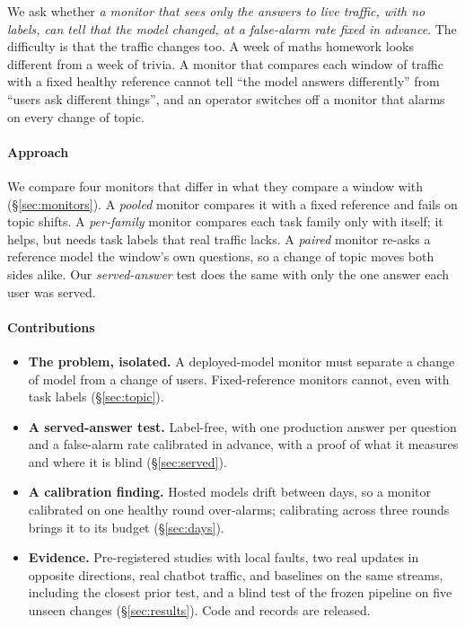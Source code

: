 \documentclass[11pt]{article}
\begin{document}
We ask whether \emph{a monitor that sees only the answers to live traffic, with no
labels, can tell that the model changed, at a false-alarm rate fixed in advance}.
The difficulty is that the traffic changes too. A week of maths homework looks
different from a week of trivia. A monitor that compares each window of traffic
with a fixed healthy reference cannot tell ``the model answers differently'' from
``users ask different things'', and an operator switches off a monitor that alarms
on every change of topic.

\paragraph{Approach} We compare four monitors that differ in what they compare a
window with (\S\ref{sec:monitors}). A \emph{pooled} monitor compares it with a
fixed reference and fails on topic shifts. A \emph{per-family} monitor compares
each task family only with itself; it helps, but needs task labels that real
traffic lacks. A \emph{paired} monitor re-asks a reference model the window's own
questions, so a change of topic moves both sides alike. Our \emph{served-answer}
test does the same with only the one answer each user was served.

\paragraph{Contributions}
\begin{itemize}[leftmargin=*,itemsep=1pt]
  \item \textbf{The problem, isolated.} A deployed-model monitor must separate a
  change of model from a change of users. Fixed-reference monitors cannot, even
  with task labels (\S\ref{sec:topic}).
  \item \textbf{A served-answer test.} Label-free, with one production answer per
  question and a false-alarm rate calibrated in advance, with a proof of what it
  measures and where it is blind (\S\ref{sec:served}).
  \item \textbf{A calibration finding.} Hosted models drift between days, so a
  monitor calibrated on one healthy round over-alarms; calibrating across three
  rounds brings it to its budget (\S\ref{sec:days}).
  \item \textbf{Evidence.} Pre-registered studies with local faults, two real
  updates in opposite directions, real chatbot traffic, and baselines on the same
  streams, including the closest prior test, and a blind test of the frozen
  pipeline on five unseen changes (\S\ref{sec:results}). Code and records are
  released.
\end{itemize}
\end{document}
